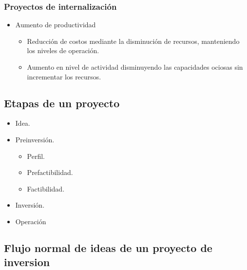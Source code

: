 \documentclass{templateNote}
\begin{document}
\subsubsection*{Proyectos de internalización}
\begin{itemize}
    \item Aumento de productividad
    \begin{itemize}
        \item Reducción de costos mediante la disminución de recursos, manteniendo los niveles de operación.
        \item Aumento en nivel de actividad disminuyendo las capacidades ociosas sin incrementar los recursos.
    \end{itemize}
\end{itemize}

\subsection*{Etapas de un proyecto}
\begin{itemize}
    \item Idea.
    \item Preinversión.
    \begin{itemize}
        \item Perfil.
        \item Prefactibilidad.
        \item Factibilidad.
    \end{itemize}
    \item Inversión.
    \item Operación
\end{itemize}

\subsection*{Flujo normal de ideas de un proyecto de inversion}
\end{document}
